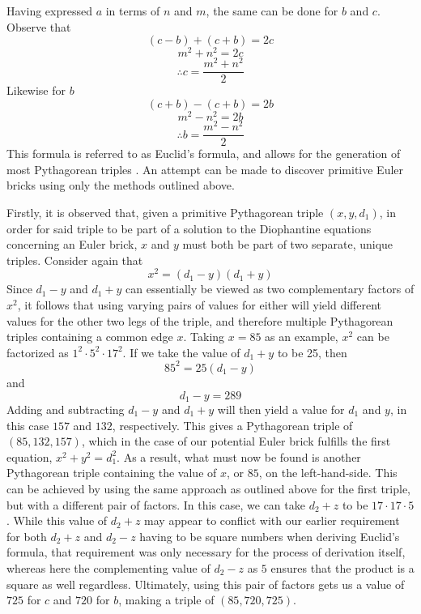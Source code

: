 \documentclass[11pt]{article}
\begin{document}
Having expressed $a$ in terms of $n$ and $m$, the same can be done for $b$ and $c$. Observe that
$$(c-b)+(c+b)=2c$$
$$m^2+n^2=2c$$
$$\therefore c=\frac{m^2+n^2}{2}$$
Likewise for $b$
$$(c+b)-(c+b)=2b$$
$$m^2-n^2=2b$$
$$\therefore b=\frac{m^2-n^2}{2}$$
This formula is referred to as Euclid's formula, and allows for the generation of most Pythagorean triples \cite{tripleparam}. An attempt can be made to discover primitive Euler bricks using only the methods outlined above.

Firstly, it is observed that, given a primitive Pythagorean triple $(x, y, d_1)$, in order for said triple to be part of a solution to the Diophantine equations concerning an Euler brick, $x$ and $y$ must both be part of two separate, unique triples. Consider again that
$$x^2=(d_1-y)(d_1+y)$$
Since $d_1-y$ and $d_1+y$ can essentially be viewed as two complementary factors of $x^2$, it follows that using varying pairs of values for either will yield different values for the other two legs of the triple, and therefore multiple Pythagorean triples containing a common edge $x$. Taking $x=85$ as an example, $x^2$ can be factorized as $1^2\cdot{5}^2\cdot{17}^2$. If we take the value of $d_1+y$ to be 25, then
$$85^2=25(d_1-y)$$
and $$d_1-y=289$$
Adding and subtracting $d_1-y$ and $d_1+y$ will then yield a value for $d_1$ and $y$, in this case $157$ and $132$, respectively. This gives a Pythagorean triple of $(85, 132, 157)$, which in the case of our potential Euler brick fulfills the first equation, $x^2+y^2=d_1^2$. As a result, what must now be found is another Pythagorean triple containing the value of $x$, or $85$, on the left-hand-side. This can be achieved by using the same approach as outlined above for the first triple, but with a different pair of factors. In this case, we can take $d_2+z$ to be $17\cdot{17}\cdot{5}$. While this value of $d_2+z$ may appear to conflict with our earlier requirement for both $d_2+z$ and $d_2-z$ having to be square numbers when deriving Euclid's formula, that requirement was only necessary for the process of derivation itself, whereas here the complementing value of $d_2-z$ as $5$ ensures that the product is a square as well regardless. Ultimately, using this pair of factors gets us a value of $725$ for $c$ and $720$ for $b$, making a triple of $(85, 720, 725)$.
\end{document}
